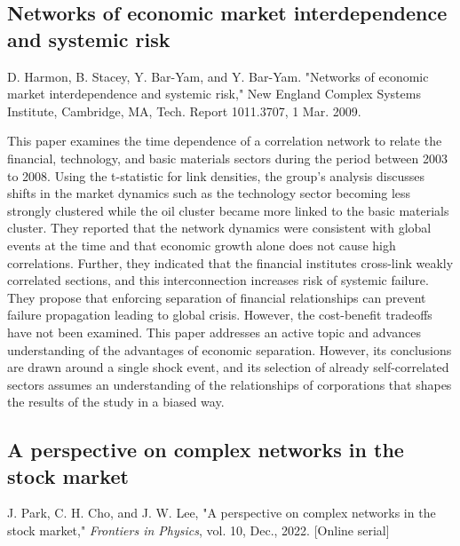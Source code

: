 \documentclass[12pt]{article}
\begin{document}
\subsection{Networks of economic market interdependence and systemic risk}
D. Harmon, B. Stacey, Y. Bar-Yam, and Y. Bar-Yam. "Networks of economic market interdependence and systemic risk," New England Complex Systems Institute, Cambridge, MA, Tech. Report 1011.3707, 1 Mar. 2009.
\newline

This paper examines the time dependence of a correlation network to relate the financial, technology, and basic materials sectors during the period between 2003 to 2008. Using the t-statistic for link densities, the group's analysis discusses shifts in the market dynamics such as the technology sector becoming less strongly clustered while the oil cluster became more linked to the basic materials cluster. They reported that the network dynamics were consistent with global events at the time and that economic growth alone does not cause high correlations. Further, they indicated that the financial institutes cross-link weakly correlated sections, and this interconnection increases risk of systemic failure. They propose that enforcing separation of financial relationships can prevent failure propagation leading to global crisis. However, the cost-benefit tradeoffs have not been examined. This paper addresses an active topic and advances understanding of the advantages of economic separation. However, its conclusions are drawn around a single shock event, and its selection of already self-correlated sectors assumes an understanding of the relationships of corporations that shapes the results of the study in a biased way.


\subsection{A perspective on complex networks in the stock market}
J. Park, C. H. Cho, and J. W. Lee, "A perspective on complex networks in the stock market," \textit{Frontiers in Physics}, vol. 10, Dec., 2022. [Online serial] %
\newline
\end{document}
